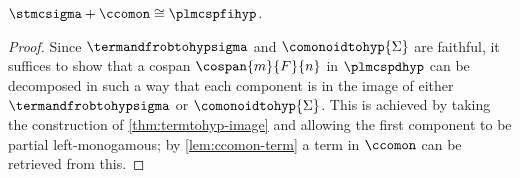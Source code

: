 \begin{theorem}\label{thm:comonoid-fully-complete}
    \(\stmcsigma + \ccomon \cong \plmcspfihyp\).
\end{theorem}
\begin{proof}
    Since \(\termandfrobtohypsigma\) and \(\comonoidtohyp{\Sigma}\) are faithful,
    it suffices to show that a cospan \(\cospan{m}{F}{n}\) in
    \(\plmcspdhyp\) can be decomposed in such a way that each component is in
    the image of either \(\termandfrobtohypsigma\) or
    \(\comonoidtohyp{\Sigma}\).
    This is achieved by taking the construction of \cref{thm:termtohyp-image}
    and allowing the first component to be partial left-monogamous; by
    \cref{lem:ccomon-term} a term in \(\ccomon\) can be retrieved from this.
\end{proof}

